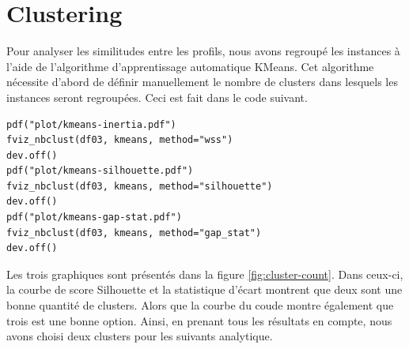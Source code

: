 \documentclass[11pt]{article}
\begin{document}
\section{Clustering}
Pour analyser les similitudes entre les profils, nous avons regroupé les
instances à l'aide de l'algorithme d'apprentissage automatique KMeans. Cet
algorithme nécessite d'abord de définir manuellement le nombre de clusters dans
lesquels les instances seront regroupées. Ceci est fait dans le code suivant.
\begin{verbatim}
pdf("plot/kmeans-inertia.pdf")
fviz_nbclust(df03, kmeans, method="wss")
dev.off()
pdf("plot/kmeans-silhouette.pdf")
fviz_nbclust(df03, kmeans, method="silhouette")
dev.off()
pdf("plot/kmeans-gap-stat.pdf")
fviz_nbclust(df03, kmeans, method="gap_stat")
dev.off()  
\end{verbatim}
Les trois graphiques sont présentés dans la figure \ref{fig:cluster-count}. Dans
ceux-ci, la courbe de score Silhouette et la statistique d'écart montrent que
deux sont une bonne quantité de clusters. Alors que la courbe du coude montre
également que trois est une bonne option. Ainsi, en prenant tous les résultats
en compte, nous avons choisi deux clusters pour les suivants analytique.\par
\end{document}
